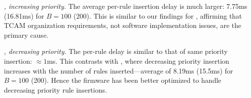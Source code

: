 \emph{\BroadcomThree, increasing priority.} 
The average per-rule insertion delay is much 
larger: 7.75ms (16.81ms) for $B = 100$ (200). This is similar to our findings
for \BroadcomOne, affirming that TCAM organization requirements, not software
implementation issues, are the primary cause.



\emph{\BroadcomThree, decreasing priority.} 
The per-rule delay is similar to that of
same priority insertion: $\approx 1$ms. This contrasts with
\BroadcomOne, where decreasing priority insertion increases with the
number of rules inserted---average of 8.19ms (15.5ms) for $B=100$ (200). 
Hence the \BroadcomThree firmware has been better optimized to handle 
decreasing priority rule insertions.


